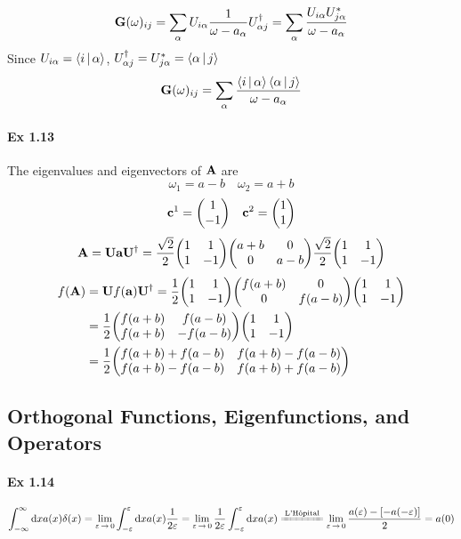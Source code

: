 \documentclass[a4paper]{article}
\DeclareMathOperator{\intdinf}{\int_{-\infty}^\infty}
\DeclareMathOperator{\ra}{\rightarrow}
\newcommand{\ex}[1]{\paragraph{Ex #1}}
\numberwithin{equation}{subsection}
\begin{document}
\begin{equation}\label{key}
\vb{G}(\omega)_{ij} = \sum_\alpha U_{i\alpha}\dfrac{1}{\omega-a_\alpha}U^\dagger_{\alpha j} = \sum_\alpha \dfrac{U_{i\alpha}U_{j\alpha}^*}{\omega-a_\alpha}
\end{equation}
Since $U_{i\alpha} = \Braket{i | \alpha}  $, $ U^\dagger_{\alpha j} = U_{j\alpha}^* = \Braket{\alpha | j} $
\begin{equation}\label{key}
\vb{G}(\omega)_{ij} = \sum_\alpha \dfrac{\Braket{i | \alpha} \Braket{\alpha | j}}{\omega-a_\alpha}
\end{equation}
\ex{1.13}
The eigenvalues and eigenvectors of $ \vb{A} $ are
\begin{equation}\label{key}
\omega_1 = a-b \quad \omega_2 = a+b
\end{equation}
\begin{equation}\label{key}
\vb{c}^1 = \mqty(1\\ -1) \quad \vb{c}^2 = \mqty(1\\ 1)
\end{equation}
\begin{equation}\label{key}
\vb{A} = \vb{U}\vb{a}\vb{U}^\dagger 
=\dfrac{\sqrt{2}}{2}\mqty(1 & 1\\1 & -1)\mqty(a+b & 0\\0 & a-b) \dfrac{\sqrt{2}}{2}\mqty(1 & 1\\1 & -1)
\end{equation}
\begin{equation}\label{key}
\begin{aligned}
f(\vb{A}) &= \vb{U}f(\vb{a})\vb{U}^\dagger = \dfrac{1}{2}\mqty(1 & 1\\1 & -1) \mqty(f(a+b) & 0\\0 & f(a-b)) \mqty(1 & 1\\1 & -1)\\
&= \dfrac{1}{2}\mqty(f(a+b) & f(a-b)\\ f(a+b) & -f(a-b)) \mqty(1 & 1\\1 & -1)\\
&= \dfrac{1}{2}\mqty(f(a+b)+f(a-b) & f(a+b)-f(a-b) \\ f(a+b)-f(a-b) & f(a+b)+f(a-b) )
\end{aligned}
\end{equation}

\subsection{Orthogonal Functions, Eigenfunctions, and Operators}
\ex{1.14}
\begin{equation}\label{key}
\intdinf \dd x a(x)\delta(x) = \lim_{\varepsilon\ra 0} \int_{-\varepsilon}^\varepsilon \dd x a(x)\dfrac{1}{2\varepsilon} = \lim_{\varepsilon\ra 0} \dfrac{1}{2\varepsilon} \int_{-\varepsilon}^\varepsilon \dd x a(x) 
\xlongequal{\text{L'H\^opital}} \lim_{\varepsilon\ra 0} \dfrac{a(\varepsilon) - [-a(-\varepsilon)]}{2} = a(0)
\end{equation}
\subsubsection{}
\end{document}
